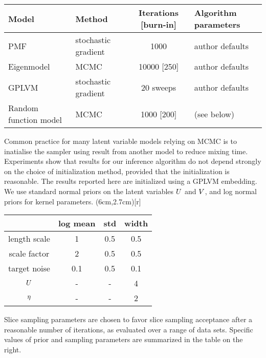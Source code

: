 
\begin{center}
  \begin{tabular}{l  l  c  l }
    Model & Method & Iterations [burn-in] & Algorithm parameters\\
    \midrule
    PMF \cite{Salakhutdinov2008} & stochastic gradient & 1000 & author defaults
    \\
    Eigenmodel \cite{Hoff2007a} & MCMC & 10000 [250] & author defaults
    \\
    GPLVM \cite{Lawrence2009} & stochastic gradient  & 20 sweeps & author defaults
    \\
    Random function model & MCMC & 1000 [200] & (see below)
  \end{tabular}
\end{center}


Common practice for many latent variable models relying on MCMC is to inatialise the sampler using 
result from another model to reduce mixing time. Experiments show that results for our inference algorithm
do not depend strongly on the choice of initialization method, provided that the initialization is reasonable.
The results reported here are initialized using a GPLVM embedding.
We use standard normal 
priors on the latent variables $U$ and $V$, and log normal priors for kernel parameters.
\vspace{-0.32cm}
\parpic(6cm,2.7cm)[r]{
\begin{minipage}[h]{8cm}
\begin{center}
  \begin{tabular}{c | c c c}
    {} & log mean & std & width \\
    \midrule
    length scale & 1 & 0.5 & 0.5 \\
    scale factor & 2 & 0.5 & 0.5 \\
    target noise & 0.1 & 0.5 & 0.1 \\
    $U$ & - & - & 4 \\
    $\eta$ & - & - & 2
  \end{tabular}
\end{center}
\end{minipage}}
Slice sampling parameters are chosen to favor slice sampling acceptance after a reasonable number of iterations, as evaluated over
a range of data sets. Specific values of prior and sampling parameters are summarized in the table on the right.


